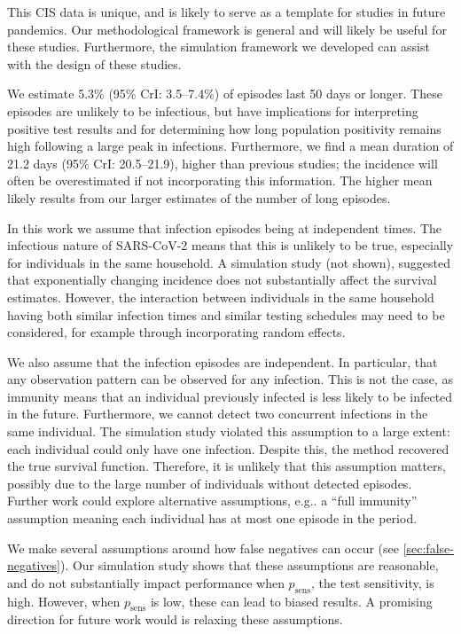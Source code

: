 \documentclass[12pt]{article}
\makeatletter
\newcommand{\psens}{p_\text{sens}}
\DeclareRobustCommand\onedot{\futurelet\@let@token\@onedot}
\def\@onedot{\ifx\@let@token.\else.\null\fi\xspace}
\def\eg{e.g\onedot} \def\Eg{{E.g}\onedot}
\makeatother
\begin{document}
This CIS data is unique, and is likely to serve as a template for studies in future pandemics.
Our methodological framework is general and will likely be useful for these studies.
Furthermore, the simulation framework we developed can assist with the design of these studies.

We estimate 5.3\% (95\% CrI: 3.5--7.4\%) of episodes last 50 days or longer.
These episodes are unlikely to be infectious, but have implications for interpreting positive test results and for determining how long population positivity remains high following a large peak in infections.
Furthermore, we find a mean duration of 21.2 days (95\% CrI: 20.5--21.9), higher than previous studies; the incidence will often be overestimated if not incorporating this information.
The higher mean likely results from our larger estimates of the number of long episodes.

In this work we assume that infection episodes being at independent times.
The infectious nature of SARS-CoV-2 means that this is unlikely to be true, especially for individuals in the same household.
A simulation study (not shown), suggested that exponentially changing incidence does not substantially affect the survival estimates.
However, the interaction between individuals in the same household having both similar infection times and similar testing schedules may need to be considered, for example through incorporating random effects.

We also assume that the infection episodes are independent.
In particular, that any observation pattern can be observed for any infection.
This is not the case, as immunity means that an individual previously infected is less likely to be infected in the future.
Furthermore, we cannot detect two concurrent infections in the same individual.
The simulation study violated this assumption to a large extent: each individual could only have one infection.
Despite this, the method recovered the true survival function.
Therefore, it is unlikely that this assumption matters, possibly due to the large number of individuals without detected episodes.
Further work could explore alternative assumptions, \eg a ``full immunity'' assumption meaning each individual has at most one episode in the period.

We make several assumptions around how false negatives can occur (see \cref{sec:false-negatives}).
Our simulation study shows that these assumptions are reasonable, and do not substantially impact performance when $\psens$, the test sensitivity, is high.
However, when $\psens$ is low, these can lead to biased results.
A promising direction for future work would is relaxing these assumptions.
\end{document}
